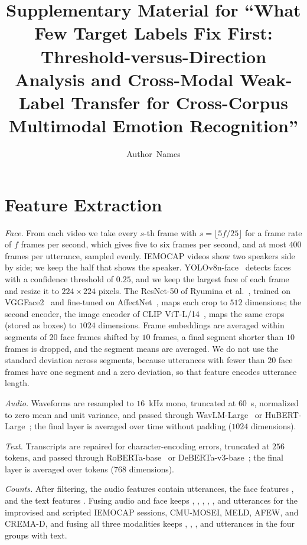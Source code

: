 \documentclass[10pt,journal,compsoc]{IEEEtran}
\begin{document}
\title{Supplementary Material for ``What Few Target Labels Fix First: Threshold-versus-Direction Analysis and Cross-Modal Weak-Label Transfer for Cross-Corpus Multimodal Emotion Recognition''}
\author{Author~Names}
\maketitle

\section{Feature Extraction}
\label{sec:supp-features}

\emph{Face.}
From each video we take every $s$-th frame with $s = \lfloor 5f/25 \rfloor$ for a frame rate of $f$ frames per second, which gives five to six frames per second, and at most $400$ frames per utterance, sampled evenly.
IEMOCAP videos show two speakers side by side; we keep the half that shows the speaker.
YOLOv8n-face~\cite{yolov8face} detects faces with a confidence threshold of $0.25$, and we keep the largest face of each frame and resize it to $224\times224$ pixels.
The ResNet-50 of Ryumina et al.~\cite{ryumina2022facial}, trained on VGGFace2~\cite{cao2018vggface2} and fine-tuned on AffectNet~\cite{mollahosseini2019affectnet}, maps each crop to $512$ dimensions; the second encoder, the image encoder of CLIP ViT-L/14~\cite{radford2021clip}, maps the same crops (stored as boxes) to $1024$ dimensions.
Frame embeddings are averaged within segments of $20$ face frames shifted by $10$ frames, a final segment shorter than $10$ frames is dropped, and the segment means are averaged.
We do not use the standard deviation across segments, because utterances with fewer than $20$ face frames have one segment and a zero deviation, so that feature encodes utterance length.

\emph{Audio.}
Waveforms are resampled to $16$~kHz mono, truncated at $60$~s, normalized to zero mean and unit variance, and passed through WavLM-Large~\cite{chen2022wavlm} or HuBERT-Large~\cite{hsu2021hubert}; the final layer is averaged over time without padding ($1024$ dimensions).

\emph{Text.}
Transcripts are repaired for character-encoding errors, truncated at $256$ tokens, and passed through RoBERTa-base~\cite{liu2019roberta} or DeBERTa-v3-base~\cite{he2023debertav3}; the final layer is averaged over tokens ($768$ dimensions).

\emph{Counts.}
After filtering, the audio features contain  utterances, the face features , and the text features .
Fusing audio and face keeps , , , , , and  utterances for the improvised and scripted IEMOCAP sessions, CMU-MOSEI, MELD, AFEW, and CREMA-D, and fusing all three modalities keeps , , , and  utterances in the four groups with text.
\end{document}
